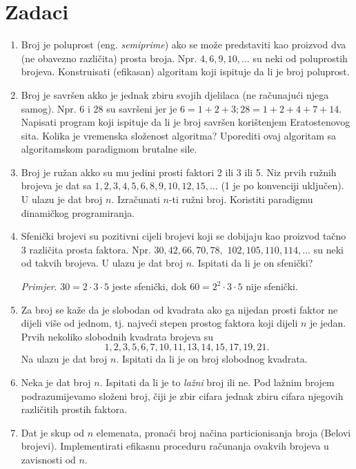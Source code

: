  
 \section{Zadaci}
 
 \begin{enumerate}
 	\item Broj je poluprost (eng. \textit{semiprime}) ako se može predstaviti
 	kao proizvod dva (ne obavezno različita) prosta broja. Npr. $4, 6, 9, 10, \ldots$ su neki od poluprostih brojeva. Konstruisati (efikasan) algoritam koji ispituje da li je broj poluprost.
 	\item Broj je savršen akko je jednak zbiru svojih djelilaca (ne računajući njega samog). Npr. 6 i 28 su savršeni jer je $6 = 1 + 2 + 3; 28 = 1 + 2 + 4 + 7 + 14$. Napisati program koji ispituje da li je broj savršen korištenjem Eratostenovog sita. Kolika je vremenska složenost algoritma? Uporediti ovaj algoritam sa algoritamskom paradigmom brutalne sile.
 	\item Broj je ružan akko su mu jedini prosti faktori 2 ili 3 ili 5. Niz prvih ružnih brojeva je dat sa $1, 2, 3, 4, 5, 6, 8, 9, 10, 12, 15, \ldots$ (1 je po
 	konvenciji uključen). U ulazu je  dat broj $n$. Izračunati $n$-ti ružni broj. Koristiti paradigmu dinamičkog programiranja.
 	\item Sfenički brojevi su pozitivni cijeli brojevi koji se dobijaju kao proizvod tačno 3 različita prosta faktora. Npr. $30, 42, 66, 70, 78,$ $102, 105, 110, 114, \ldots$ su neki od takvih brojeva. U ulazu je dat broj $n$. Ispitati da li je on sfenički? 
 	
 	\textit{Primjer}. $30=2 \cdot 3 \cdot 5$ jeste sfenički, dok $60 = 2^2 \cdot 3 \cdot 5 $ nije sfenički. 
 	\item Za broj se kaže da je slobodan od kvadrata ako ga nijedan
 	prosti faktor ne dijeli više od jednom, tj. najveći stepen prostog
 	faktora koji dijeli $n$  je jedan.  Prvih nekoliko slobodnih kvadrata brojeva su $$1, 2, 3, 5, 6, 7,
 	10, 11, 13, 14, 15, 17, 19, 21.$$   Na ulazu je dat broj $n$. Ispitati da li je on broj 	slobodnog kvadrata.
 	\item Neka je dat broj $n$. Ispitati da li je to \textit{lažni} broj ili ne.
 	Pod lažnim brojem podrazumijevamo složeni broj, čiji je zbir cifara jednak zbiru cifara njegovih različitih prostih faktora.%
 	
 	\item Dat je skup od $n$ elemenata, pronaći broj načina particionisanja broja (Belovi brojevi). Implementirati efikasnu proceduru računanja ovakvih brojeva u zavisnosti od $n$.  %
 \end{enumerate}